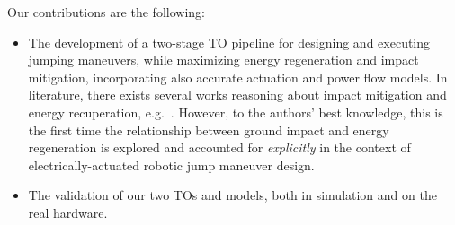 Our contributions are the following:
\begin{itemize}
    \item The development of a two-stage TO pipeline for designing and executing jumping maneuvers, while maximizing energy regeneration and impact mitigation, incorporating also accurate actuation and power flow models.
     In literature, there exists several works reasoning about impact mitigation and energy recuperation, e.g.~\cite{agile_bots::katz2019mini,agile_bots::hawkes2022engineered,agile_bots::chignoli2021humanoid}. However, to the authors' best knowledge, this is the first time the relationship between ground impact and energy regeneration is explored and accounted for \textit{explicitly}  in the context of electrically-actuated robotic jump maneuver design.
    \item The validation of our two TOs and models, both  in simulation and on the real hardware.
\end{itemize}
